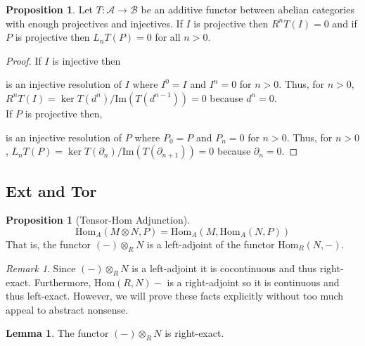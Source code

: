 \documentclass[12pt]{article}
\renewcommand{\Im}[1]{\mathrm{Im}(#1)}
\newcommand{\Homover}[3]{\mathrm{Hom}_{#1} \left( #2, #3 \right)}
\newcommand{\Hom}[2]{\mathrm{Hom}\left(#1, #2 \right)}
\theoremstyle{remark}
\newtheorem*{remark}{Remark}
\theoremstyle{definition}
\newtheorem{lemma}[theorem]{Lemma}
\newtheorem{proposition}[theorem]{Proposition}
\begin{document}
\begin{proposition} \label{derived_functor_applied_to_proj_or_inj}
Let $T : \mathcal{A} \to \mathcal{B}$ be an additive functor between abelian categories with enough projectives and injectives. If $I$ is projective then $R^n T(I) = 0$ and if $P$ is projective then $L_n T(P) = 0$ for all $n > 0$.
\end{proposition}

\begin{proof}
If $I$ is injective then
\begin{center}
\end{center}
is an injective resolution of $I$ where $I^0 = I$ and $I^n = 0$ for $n > 0$. Thus, for $n > 0$, $R^n T(I) = \ker{T(d^n)} / \Im{T(d^{n-1})} = 0$
because $d^n = 0$.
\bigskip\\
If $P$ is projective then,
\begin{center}
\end{center}
is an injective resolution of $P$ where $P_0 = P$ and $P_n = 0$ for $n > 0$. Thus, for $n > 0$, $L_n T(P) = \ker{T(\partial_n)} / \Im{T(\partial_{n+1})} = 0$
because $\partial_n = 0$.
\end{proof}

\subsection{Ext and Tor}

\begin{proposition}[Tensor-Hom Adjunction]
\[ \Homover{A}{M \otimes N}{P} = \Homover{A}{M}{\Homover{A}{N}{P}} \]
That is, the functor $(-) \otimes_R N$ is a left-adjoint of the functor $\Homover{R}{N}{-}$. 
\end{proposition}

\begin{remark}
Since $(-) \otimes_R N$ is a left-adjoint it is cocontinuous and thus right-exact. Furthermore, $\Hom{R}{N}{-}$ is a right-adjoint so it is continuous and thus left-exact. However, we will prove these facts explicitly without too much appeal to abstract nonsense. 
\end{remark}

\begin{lemma}
The functor $(-) \otimes_R N$ is right-exact.
\end{lemma}
\end{document}
